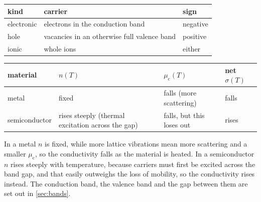         \begin{table}[H]
            \centering
            \begin{minipage}[t]{0.41\textwidth}\vspace{0pt}
                \centering
                \small
                \renewcommand{\arraystretch}{1.25}
                \begin{tabularx}{\linewidth}{@{}lLL@{}}
                    \hline
                    \textbf{kind} & \textbf{carrier} & \textbf{sign} \\
                    \hline
                    electronic & electrons in the conduction band & negative \\
                    hole & vacancies in an otherwise full valence band & positive \\
                    ionic & whole ions & either \\
                    \hline
                \end{tabularx}
                \label{tab:conduction-kinds}
            \end{minipage}%
            \hfill
            \begin{minipage}[t]{0.53\textwidth}\vspace{0pt}
                \centering
                \small
                \renewcommand{\arraystretch}{1.25}
                \begin{tabularx}{\linewidth}{@{}lLLL@{}}
                    \hline
                    \textbf{material} & \textbf{$n(T)$} & \textbf{$\mu_{\text{c}}(T)$} & \textbf{net $\sigma(T)$} \\
                    \hline
                    metal & fixed & falls (more scattering) & falls \\
                    semiconductor & rises steeply (thermal excitation across the gap) & falls, but this loses out & rises \\
                    \hline
                \end{tabularx}
                \label{tab:conduction-temperature}
            \end{minipage}
        \end{table}

        In a metal $n$ is fixed, while more lattice vibrations mean more scattering and a smaller $\mu_{\text{c}}$, so the conductivity falls as the material is heated. In a semiconductor $n$ rises steeply with temperature, because carriers must first be excited across the band gap, and that easily outweighs the loss of mobility, so the conductivity rises instead. The conduction band, the valence band and the gap between them are set out in \cref{sec:bands}.

